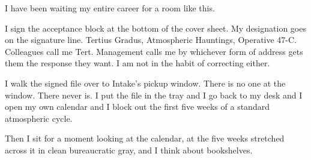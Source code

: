 I have been waiting my entire career for a room like this.

I sign the acceptance block at the bottom of the cover sheet. My designation goes on the signature line. Tertius Gradus, Atmospheric Hauntings, Operative 47-C. Colleagues call me Tert. Management calls me by whichever form of address gets them the response they want. I am not in the habit of correcting either.

I walk the signed file over to Intake's pickup window. There is no one at the window. There never is. I put the file in the tray and I go back to my desk and I open my own calendar and I block out the first five weeks of a standard atmospheric cycle.

Then I sit for a moment looking at the calendar, at the five weeks stretched across it in clean bureaucratic gray, and I think about bookshelves.
